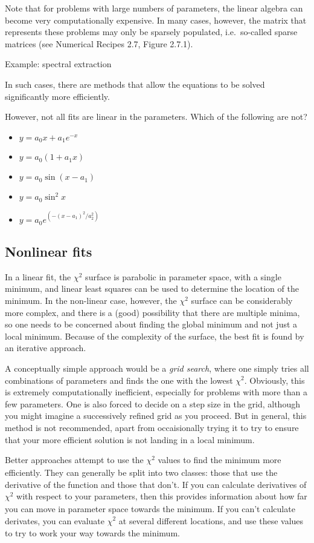 \documentclass{article}
\begin{document}
Note that for problems with large numbers of parameters, the linear algebra
can become very computationally expensive. In many cases, however, the
matrix that represents these problems may only be sparsely populated,
i.e.\ so-called sparse matrices (see Numerical Recipes 2.7, Figure 2.7.1).

Example: spectral extraction

In such cases, there are methods that allow the equations to be solved
significantly more efficiently.

However, not all fits are linear in the parameters. Which of the
following are not?
\begin{itemize}
    \item $y = a_{0}x + a_{1}e^{-x}$
    \item $y = a_{0}(1 + a_{1}x)$
    \item $y = a_{0}\sin(x - a_{1})$
    \item $y = a_{0}\sin^{2}x$
    \item $y = a_{0}e^{(-(x-a_{1})^{2}/a_{2}^{2})}$
\end{itemize}

\subsection{Nonlinear fits}
In a linear fit, the $\chi^{2}$ surface is parabolic in parameter
space, with a single minimum, and linear least squares can be used to
determine the location of the minimum. In the non-linear case, however, the
$\chi^{2}$ surface can be considerably more complex, and there is a
(good) possibility that there are multiple minima, so one needs to be
concerned about finding the global minimum and not just a local minimum.
Because of the complexity of the surface, the best fit is found by an
iterative approach.

A conceptually simple approach would be a \emph{grid search}, where one simply
tries all combinations of parameters and finds the one with the lowest
$\chi^{2}$. Obviously, this is extremely computationally inefficient,
especially for problems with more than a few parameters. One is also forced
to decide on a step size in the grid, although you might imagine a
successively refined grid as you proceed. But in general, this method is
not recommended, apart from occaisionally trying it to try to ensure that
your more efficient solution is not landing in a local minimum.

Better approaches attempt to use the $ \chi^{2}_{}$ values to find the
minimum more efficiently. They can generally be split into two classes:
those that use the derivative of the function and those that don't. If you
can calculate derivatives of $ \chi^{2}_{}$ with respect to your
parameters, then this provides information about how far you can move in
parameter space towards the minimum. If you can't calculate derivates, you
can evaluate $ \chi^{2}_{}$ at several different locations, and use these
values to try to work your way towards the minimum.
\end{document}
